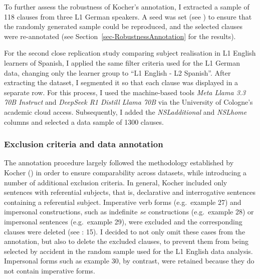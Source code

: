 \documentclass[
  letterpaper,
  DIV=11,
  numbers=noendperiod]{scrartcl}
\begin{document}
To further assess the robustness of Kocher's annotation, I extracted a
sample of 118 clauses from three L1 German speakers. A seed was set (see
) to ensure that the randomly
generated sample could be reproduced, and the selected clauses were
re-annotated (see Section~\ref{sec-RobustnessAnnotation} for the
results).

For the second close replication study comparing subject realisation in
L1 English learners of Spanish, I applied the same filter criteria used
for the L1 German data, changing only the learner group to ``L1 English
- L2 Spanish''. After extracting the dataset, I segmented it so that
each clause was displayed in a separate row. For this process, I used
the machine-based tools \emph{Meta Llama 3.3 70B Instruct} and
\emph{DeepSeek R1 Distill Llama 70B} via the University of Cologne's
academic cloud access. Subsequently, I added the \emph{NSLadditional}
and \emph{NSLhome} columns and selected a data sample of 1300 clauses.

\subsubsection{Exclusion criteria and data
annotation}\label{sec-data-annotation}

The annotation procedure largely followed the methodology established by
Kocher () in order to ensure
comparability across datasets, while introducing a number of additional
exclusion criteria. In general, Kocher included only sentences with
referential subjects, that is, declarative and interrogative sentences
containing a referential subject. Imperative verb forms (e.g.~example
27) and impersonal constructions, such as indefinite \emph{se}
constructions (e.g.~example 28) or impersonal sentences (e.g.~example
29), were excluded and the corresponding clauses were deleted (see
: 15). I decided to not
only omit these cases from the annotation, but also to delete the
excluded clauses, to prevent them from being selected by accident in the
random sample used for the L1 English data analysis. Impersonal forms
such as example 30, by contrast, were retained because they do not
contain imperative forms.
\end{document}
